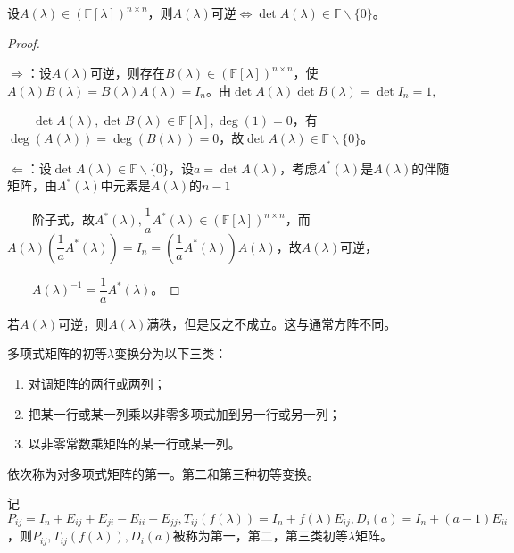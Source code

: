         \begin{theorem}
            \label{thm:poly_matrix_invertible}
            设$A(\lambda)\in(\mathbb{F}[\lambda])^{n\times n}$，则$A(\lambda)$可逆$\Leftrightarrow\det A(\lambda)\in\mathbb{F}\backslash\{0\}$。
        \end{theorem}

        \begin{proof}
            $ $

            $\Rightarrow$：设$A(\lambda)$可逆，则存在$B(\lambda)\in(\mathbb{F}[\lambda])^{n\times n}$，使$A(\lambda)B(\lambda)=B(\lambda)A(\lambda)=I_n$。由$\det A(\lambda)\det B(\lambda)=\det I_n=1, $

            $\qquad\det A(\lambda), \det B(\lambda)\in\mathbb{F}[\lambda], \deg(1)=0$，有$\deg(A(\lambda))=\deg(B(\lambda))=0$，故$\det A(\lambda)\in\mathbb{F}\backslash\{0\}$。

            $\Leftarrow$：设$\det A(\lambda)\in\mathbb{F}\backslash\{0\}$，设$a=\det A(\lambda)$，考虑$A^*(\lambda)$是$A(\lambda)$的伴随矩阵，由$A^*(\lambda)$中元素是$A(\lambda)$的$n-1$

            $\qquad$阶子式，故$A^*(\lambda),\dfrac1a A^*(\lambda)\in(\mathbb{F}[\lambda])^{n\times n}$，而$A(\lambda)\left(\dfrac1a A^*(\lambda)\right)=I_n=\left(\dfrac1a A^*(\lambda)\right)A(\lambda)$，故$A(\lambda)$可逆，

            $\qquad A(\lambda)^{-1}=\dfrac1a A^*(\lambda)$。
        \end{proof}

        \begin{note}
            若$A(\lambda)$可逆，则$A(\lambda)$满秩，但是反之不成立。这与通常方阵不同。
        \end{note}

        \begin{definition}
            多项式矩阵的初等$\lambda$变换分为以下三类：
            \begin{enumerate}
                \item 对调矩阵的两行或两列；
                \item 把某一行或某一列乘以非零多项式加到另一行或另一列；
                \item 以非零常数乘矩阵的某一行或某一列。
            \end{enumerate}
            依次称为对多项式矩阵的第一。第二和第三种初等变换。

            记$P_{ij}=I_n+E_{ij}+E_{ji}-E_{ii}-E_{jj}, T_{ij}(f(\lambda))=I_n+f(\lambda)E_{ij}, D_i(a)=I_n+(a-1)E_{ii}$，则$P_{ij}, T_{ij}(f(\lambda)), D_i(a)$被称为第一，第二，第三类初等$\lambda$矩阵。
        \end{definition}

